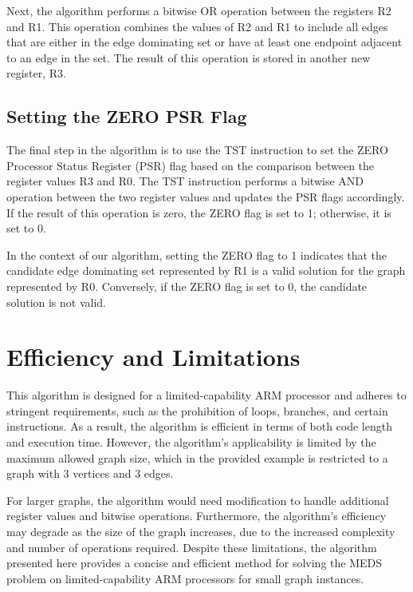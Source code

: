Next, the algorithm performs a bitwise OR operation between the registers R2 and R1. This operation combines the values of R2 and R1 to include all edges that are either in the edge dominating set or have at least one endpoint adjacent to an edge in the set. The result of this operation is stored in another new register, R3.

\subsection{Setting the ZERO PSR Flag}

The final step in the algorithm is to use the TST instruction to set the ZERO Processor Status Register (PSR) flag based on the comparison between the register values R3 and R0. The TST instruction performs a bitwise AND operation between the two register values and updates the PSR flags accordingly. If the result of this operation is zero, the ZERO flag is set to 1; otherwise, it is set to 0.

In the context of our algorithm, setting the ZERO flag to 1 indicates that the candidate edge dominating set represented by R1 is a valid solution for the graph represented by R0. Conversely, if the ZERO flag is set to 0, the candidate solution is not valid.

\section{Efficiency and Limitations}

This algorithm is designed for a limited-capability ARM processor and adheres to stringent requirements, such as the prohibition of loops, branches, and certain instructions. As a result, the algorithm is efficient in terms of both code length and execution time. However, the algorithm's applicability is limited by the maximum allowed graph size, which in the provided example is restricted to a graph with 3 vertices and 3 edges.

For larger graphs, the algorithm would need modification to handle additional register values and bitwise operations. Furthermore, the algorithm's efficiency may degrade as the size of the graph increases, due to the increased complexity and number of operations required. Despite these limitations, the algorithm presented here provides a concise and efficient method for solving the MEDS problem on limited-capability ARM processors for small graph instances.



